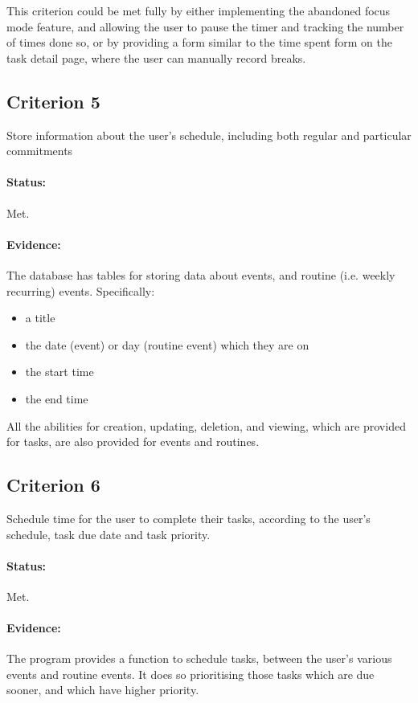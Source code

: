 \documentclass{article}
\begin{document}
This criterion could be met fully by either implementing the abandoned focus mode feature,
and allowing the user to pause the timer and tracking the number of times done so,
or by providing a form similar to the time spent form on the task detail page,
where the user can manually record breaks.

\subsection*{Criterion 5}
Store information about the user's schedule,
including both regular and particular commitments

\paragraph{Status:}
Met.

\paragraph{Evidence:}
The database has tables for storing data about events,
and routine (i.e. weekly recurring) events.
Specifically:
\begin{samepage}
	\begin{itemize}
		\item a title
		\item the date (event) or day (routine event) which they are on
		\item the start time
		\item the end time
	\end{itemize}
\end{samepage}

All the abilities for creation, updating, deletion, and viewing,
which are provided for tasks,
are also provided for events and routines.

\subsection*{Criterion 6}
Schedule time for the user to complete their tasks, according to the
user's schedule, task due date and task priority.

\paragraph{Status:}
Met.

\paragraph{Evidence:}
The program provides a function to schedule tasks,
between the user's various events and routine events.
It does so prioritising those tasks which are due sooner,
and which have higher priority.
\end{document}
